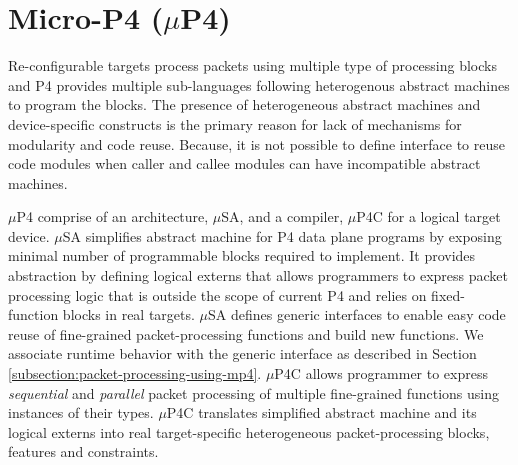 \section{Micro-P4 \;($\mu$P4)}
Re-configurable targets process packets using multiple type of processing blocks and P4 provides multiple sub-languages following heterogenous abstract machines to program the blocks.
The presence of heterogeneous abstract machines and device-specific constructs is the
primary reason for lack of mechanisms for modularity and code reuse.
Because, it is not possible to define interface to reuse code modules when caller and callee modules can have incompatible abstract machines.


$\mu$P4 comprise of an architecture, $\mu$SA, and a compiler, $\mu$P4C for a logical target device. 
$\mu$SA simplifies abstract machine for P4 data plane programs by exposing minimal number of programmable blocks required to implement.
It provides abstraction by defining logical externs that allows programmers to express packet processing logic that is outside the scope of current P4 and relies on fixed-function blocks in real targets.
$\mu$SA defines generic interfaces to enable easy code reuse of fine-grained packet-processing functions and build new functions.
We associate runtime behavior with the generic interface as described in Section \ref{subsection:packet-processing-using-mp4}. 
$\mu$P4C allows programmer to express \emph{sequential} and \emph{parallel} packet processing of multiple fine-grained functions using instances of their types.
$\mu$P4C translates simplified abstract machine and its logical externs into real target-specific heterogeneous packet-processing blocks, features and constraints.


